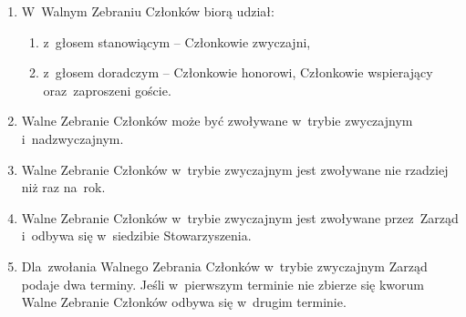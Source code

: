 \documentclass{article}
\begin{document}
\begin{enumerate}
\begin{enumerate}
        \item ustalanie wysokości i~sposobu uiszczania składek członkowskich,
        \item rozpatrywanie i~zatwierdzanie sprawozdań władz Stowarzyszenia:
          \begin{enumerate}
            \item W~przypadku odrzucenia sprawozdania, Walne Zebranie Członków przygotowuje listę poprawek, które Zarząd ma obowiązek wprowadzić.
            \item Poprawione sprawozdanie Zarząd przekazuje w~ciągu 7 dni Komisji Rewizyjnej, która zatwierdza jego zgodność z~wytycznymi Walnego Zebrania Członków.
          \end{enumerate}
        \item rozpatrywanie wniosków i~postulatów zgłoszonych przez~Członków Stowarzyszenia lub~jego władze,
        \item rozpatrywanie odwołań od~uchwał Zarządu,
        \item podejmowanie uchwały o~rozwiązaniu Stowarzyszenia i~przeznaczeniu jego majątku,
        \item przyjmowanie i~skreślanie Członków honorowych,
        \item podejmowanie uchwał w~każdej sprawie wniesionej pod~obrady, we wszystkich sprawach nie zastrzeżonych do~kompetencji innych władz Stowarzyszenia.
      \end{enumerate}
        \item W~Walnym Zebraniu Członków biorą udział:
          \begin{enumerate}
            \item z~głosem stanowiącym – Członkowie zwyczajni,
            \item z~głosem doradczym – Członkowie honorowi, Członkowie wspierający oraz~zaproszeni goście.
          \end{enumerate}
        \item Walne Zebranie Członków może być zwoływane w~trybie zwyczajnym i~nadzwyczajnym.
        \item Walne Zebranie Członków w~trybie zwyczajnym jest zwoływane nie rzadziej niż raz na~rok.
        \item Walne Zebranie Członków w~trybie zwyczajnym jest zwoływane przez~Zarząd i~odbywa się w~siedzibie Stowarzyszenia.
    \item Dla~zwołania Walnego Zebrania Członków w~trybie zwyczajnym Zarząd podaje dwa terminy. Jeśli w~pierwszym terminie nie zbierze się kworum Walne Zebranie Członków odbywa się w~drugim terminie.

\end{enumerate}
\end{document}
